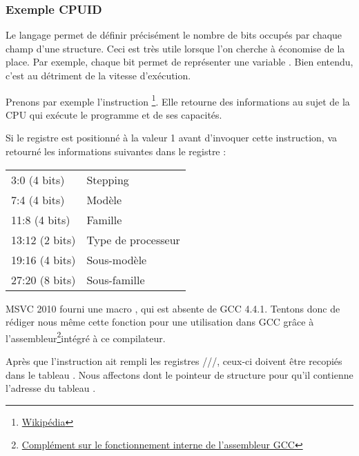 ﻿\subsubsection{Exemple CPUID}

Le langage \CCpp permet de définir précisément le nombre de bits occupés par chaque champ d'une structure. 
Ceci est très utile lorsque l'on cherche à économise de la place. Par exemple, chaque bit permet de 
représenter une variable \Tbool. Bien entendu, c'est au détriment de la vitesse d'exécution.

\newcommand{\FNCPUID}{\footnote{\href{http://go.yurichev.com/17069}{Wikipédia}}}

\label{cpuid}

Prenons par exemple l'instruction \CPUID\FNCPUID. Elle retourne des informations au sujet de la CPU qui 
exécute le programme et de ses capacités.

Si le registre \EAX est positionné à la valeur 1 avant d'invoquer cette instruction, \CPUID va retourné 
les informations suivantes dans le registre \EAX:

\begin{center}
\begin{tabular}{ | l | l | }
\hline
3:0 (4 bits)& Stepping \\
7:4 (4 bits) & Modèle \\
11:8 (4 bits) & Famille \\
13:12 (2 bits) & Type de processeur \\
19:16 (4 bits) & Sous-modèle \\
27:20 (8 bits) & Sous-famille \\
\hline
\end{tabular}
\end{center}

\newcommand{\FNGCCAS}{\footnote{\href{http://go.yurichev.com/17070}
{Complément sur le fonctionnement interne de l'assembleur GCC}}}

MSVC 2010 fourni une macro \CPUID, qui est absente de GCC 4.4.1. Tentons donc de rédiger nous même cette 
fonction pour une utilisation dans GCC grâce à l'assembleur\FNGCCAS intégré à ce compilateur.



Après que l'instruction \CPUID ait rempli les registres \EAX/\EBX/\ECX/\EDX, ceux-ci doivent être recopiés 
dans le tableau . Nous affectons dont le pointeur de structure  pour qu'il 
contienne l'adresse du tableau .

